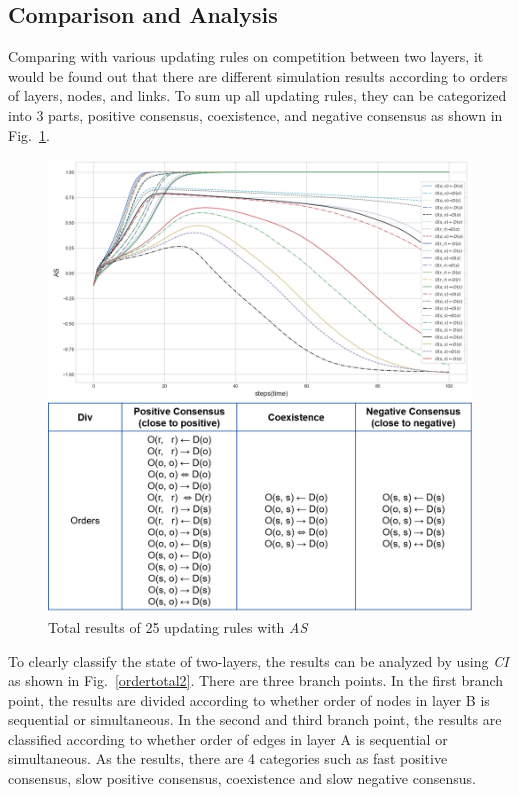 \documentclass[review]{elsarticle}
\begin{document}
\subsection{Comparison and Analysis}
Comparing with various updating rules on competition between two layers, it would be found out that there are different simulation results according to orders of layers, nodes, and links. To sum up all updating rules, they can be categorized into 3 parts, positive consensus, coexistence, and negative consensus as shown in Fig.~\ref{ordertotal}.  
\begin{figure}[!htb]
	\centering
	\includegraphics[width=\hsize]{ordertotal.png}
	\caption{Total results of 25 updating rules with \textit{AS}}
	\label{ordertotal}
\end{figure}

To clearly classify the state of two-layers, the results can be analyzed by using \textit{CI} as shown in Fig.~\ref{ordertotal2}. There are three branch points. In the first branch point, the results are divided according to whether order of nodes in layer B is sequential or simultaneous. In the second and third branch point, the results are classified according to whether order of edges in layer A is sequential or simultaneous. As the results, there are 4 categories such as fast positive consensus, slow positive consensus, coexistence and slow negative consensus.
 
\end{document}

